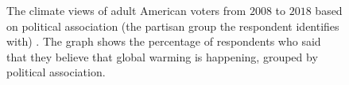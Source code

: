 \documentclass{paper}
\begin{document}
\begin{figure}[!hpb]
\begin{minipage}[t]{.49\textwidth}
        \caption{The climate views of adult American voters from $2008$ to $2018$ based on political association (the partisan group the respondent identifies with) \cite{https://doi.org/10.17605/osf.io/jw79p, Ballew2019}. The graph shows the percentage of respondents who said that they believe that global warming is happening, grouped by political association.}
        \label{fig:climate_views_over_time_PoliticalAssociation}
    \end{minipage}%
\end{figure}
\end{document}
